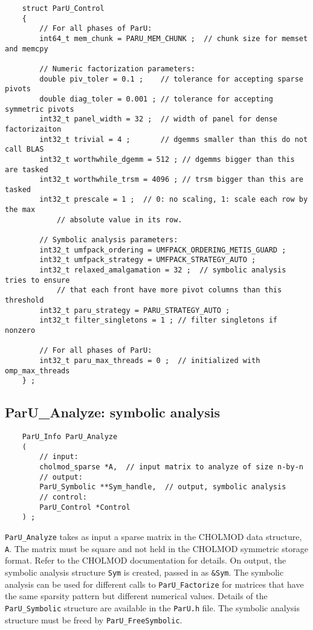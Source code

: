 \documentclass[12pt]{article}
\begin{document}
    {\footnotesize
    \begin{verbatim}
    struct ParU_Control
    {
        // For all phases of ParU:
        int64_t mem_chunk = PARU_MEM_CHUNK ;  // chunk size for memset and memcpy

        // Numeric factorization parameters:
        double piv_toler = 0.1 ;    // tolerance for accepting sparse pivots
        double diag_toler = 0.001 ; // tolerance for accepting symmetric pivots
        int32_t panel_width = 32 ;  // width of panel for dense factorizaiton
        int32_t trivial = 4 ;       // dgemms smaller than this do not call BLAS
        int32_t worthwhile_dgemm = 512 ; // dgemms bigger than this are tasked
        int32_t worthwhile_trsm = 4096 ; // trsm bigger than this are tasked
        int32_t prescale = 1 ;  // 0: no scaling, 1: scale each row by the max
            // absolute value in its row.

        // Symbolic analysis parameters:
        int32_t umfpack_ordering = UMFPACK_ORDERING_METIS_GUARD ;
        int32_t umfpack_strategy = UMFPACK_STRATEGY_AUTO ;
        int32_t relaxed_amalgamation = 32 ;  // symbolic analysis tries to ensure
            // that each front have more pivot columns than this threshold
        int32_t paru_strategy = PARU_STRATEGY_AUTO ;
        int32_t filter_singletons = 1 ; // filter singletons if nonzero

        // For all phases of ParU:
        int32_t paru_max_threads = 0 ;  // initialized with omp_max_threads
    } ; \end{verbatim}}

\subsection{{\sf ParU\_Analyze}: symbolic analysis}

    {\footnotesize
    \begin{verbatim}
    ParU_Info ParU_Analyze
    (
        // input:
        cholmod_sparse *A,  // input matrix to analyze of size n-by-n
        // output:
        ParU_Symbolic **Sym_handle,  // output, symbolic analysis
        // control:
        ParU_Control *Control
    ) ; \end{verbatim}}

    \verb'ParU_Analyze' takes as input a sparse matrix in the CHOLMOD data
    structure, \verb'A'.  The matrix must be square and not held in the CHOLMOD
    symmetric storage format.  Refer to the CHOLMOD documentation for details.
    On output, the symbolic analysis structure \verb'Sym' is created, passed in
    as \verb'&Sym'.  The symbolic analysis can be used for different calls to
    \verb'ParU_Factorize' for matrices that have the same sparsity pattern but
    different numerical values.  Details of the \verb'ParU_Symbolic' structure
    are available in the \verb'ParU.h' file.  The symbolic analysis structure
    must be freed by \verb'ParU_FreeSymbolic'.
\end{document}
